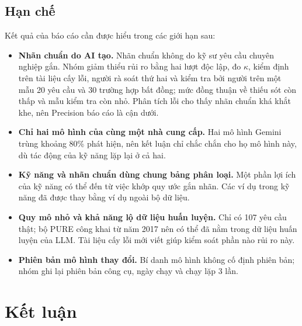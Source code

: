 \documentclass[12pt,a4paper]{report}
\begin{document}
\section{Hạn chế}
\label{sec:threats}
Kết quả của báo cáo cần được hiểu trong các giới hạn sau:
\begin{itemize}
  \item \textbf{Nhãn chuẩn do AI tạo.} Nhãn chuẩn không do kỹ sư yêu cầu chuyên nghiệp gắn. Nhóm giảm thiểu rủi ro bằng hai lượt độc lập, đo $\kappa$, kiểm định trên tài liệu cấy lỗi, người rà soát thứ hai và kiểm tra bởi người trên một mẫu 20 yêu cầu và 30 trường hợp bất đồng; mức đồng thuận về thiếu sót còn thấp và mẫu kiểm tra còn nhỏ. Phân tích lỗi cho thấy nhãn chuẩn khá khắt khe, nên Precision báo cáo là cận dưới.
  \item \textbf{Chỉ hai mô hình của cùng một nhà cung cấp.} Hai mô hình Gemini trùng khoảng 80\% phát hiện, nên kết luận chỉ chắc chắn cho họ mô hình này, dù tác động của kỹ năng lặp lại ở cả hai.
  \item \textbf{Kỹ năng và nhãn chuẩn dùng chung bảng phân loại.} Một phần lợi ích của kỹ năng có thể đến từ việc khớp quy ước gắn nhãn. Các ví dụ trong kỹ năng đã được thay bằng ví dụ ngoài bộ dữ liệu.
  \item \textbf{Quy mô nhỏ và khả năng lộ dữ liệu huấn luyện.} Chỉ có 107 yêu cầu thật; bộ PURE công khai từ năm 2017 nên có thể đã nằm trong dữ liệu huấn luyện của LLM. Tài liệu cấy lỗi mới viết giúp kiểm soát phần nào rủi ro này.
  \item \textbf{Phiên bản mô hình thay đổi.} Bí danh mô hình không cố định phiên bản; nhóm ghi lại phiên bản công cụ, ngày chạy và chạy lặp 3 lần.
\end{itemize}

\chapter{Kết luận}
\end{document}
